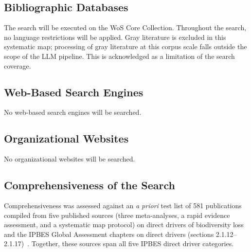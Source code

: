 \documentclass[12pt]{article}
\begin{document}
\subsection*{Bibliographic Databases}
The search will be executed on the WoS Core Collection. Throughout the search, no language restrictions will be applied. Gray literature is excluded in this systematic map; processing of gray literature at this corpus scale falls outside the scope of the LLM pipeline. This is acknowledged as a limitation of the search coverage.

\subsection*{Web-Based Search Engines}
No web-based search engines will be searched.

\subsection*{Organizational Websites}
No organizational websites will be searched.
\subsection*{Comprehensiveness of the Search}
Comprehensiveness was assessed against an \emph{a priori} test list of 581 publications compiled from five published sources (three meta-analyses, a rapid evidence assessment, and a systematic map protocol) on direct drivers of biodiversity loss~\cite{moullec_identifying_2021, jaureguiberry_direct_2022, beckmann_conventional_2019, benitez-lopez_impact_2017, urban_accelerating_2015} and the IPBES Global Assessment chapters on direct drivers (sections 2.1.12--2.1.17)~\cite{balvanera_chapter_2019}. Together, these sources span all five IPBES direct driver categories.
\end{document}
